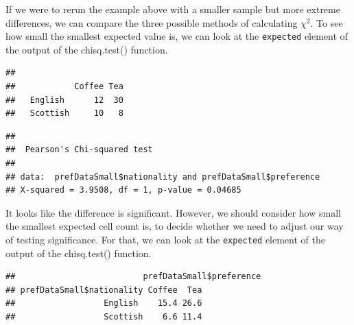 \documentclass[
]{book}
\newenvironment{Shaded}{\begin{snugshade}}{\end{snugshade}}
\newcommand{\DataTypeTok}[1]{\textcolor[rgb]{0.13,0.29,0.53}{#1}}
\newcommand{\KeywordTok}[1]{\textcolor[rgb]{0.13,0.29,0.53}{\textbf{#1}}}
\newcommand{\NormalTok}[1]{#1}
\newcommand{\OperatorTok}[1]{\textcolor[rgb]{0.81,0.36,0.00}{\textbf{#1}}}
\newcommand{\OtherTok}[1]{\textcolor[rgb]{0.56,0.35,0.01}{#1}}
\begin{document}
If we were to rerun the example above with a smaller sample but more extreme differences, we can compare the three possible methods of calculating \(\chi^2\). To see how small the smallest expected value is, we can look at the \texttt{expected} element of the output of the chisq.test() function.

\begin{Shaded}
\end{Shaded}

\begin{verbatim}
##           
##            Coffee Tea
##   English      12  30
##   Scottish     10   8
\end{verbatim}

\begin{Shaded}
\end{Shaded}

\begin{verbatim}
## 
## 	Pearson's Chi-squared test
## 
## data:  prefDataSmall$nationality and prefDataSmall$preference
## X-squared = 3.9508, df = 1, p-value = 0.04685
\end{verbatim}

It looks like the difference is significant. However, we should consider how small the smallest expected cell count is, to decide whether we need to adjust our way of testing significance. For that, we can look at the \texttt{expected} element of the output of the chisq.test() function.

\begin{Shaded}
\end{Shaded}

\begin{verbatim}
##                          prefDataSmall$preference
## prefDataSmall$nationality Coffee  Tea
##                  English    15.4 26.6
##                  Scottish    6.6 11.4
\end{verbatim}
\end{document}
